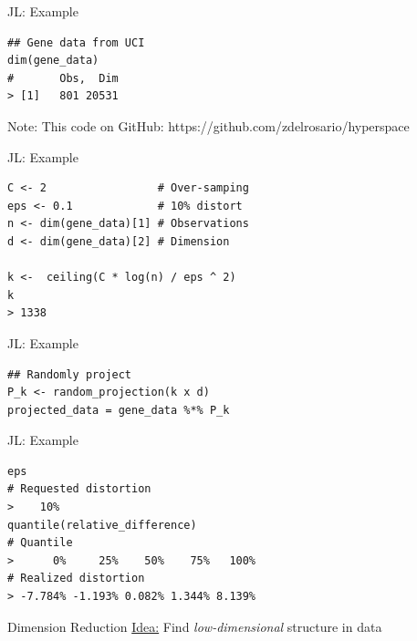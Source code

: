 \documentclass[14pt]{beamer}
\begin{document}
\begin{frame}[fragile]{JL: Example}
  \begin{lstlisting}
## Gene data from UCI
dim(gene_data)
#       Obs,  Dim
> [1]   801 20531
  \end{lstlisting}

  \bigskip
  Note: This code on GitHub: https://github.com/zdelrosario/hyperspace
\end{frame}

\begin{frame}[fragile]{JL: Example}
  \begin{lstlisting}
C <- 2                 # Over-samping
eps <- 0.1             # 10% distort
n <- dim(gene_data)[1] # Observations
d <- dim(gene_data)[2] # Dimension

k <-  ceiling(C * log(n) / eps ^ 2)
k
> 1338
  \end{lstlisting}
\end{frame}

\begin{frame}[fragile]{JL: Example}
  \begin{lstlisting}
## Randomly project
P_k <- random_projection(k x d)
projected_data = gene_data %*% P_k
  \end{lstlisting}
\end{frame}

\begin{frame}[fragile]{JL: Example}
  \begin{lstlisting}
eps
# Requested distortion
>    10%
quantile(relative_difference)
# Quantile
>      0%     25%    50%    75%   100%
# Realized distortion
> -7.784% -1.193% 0.082% 1.344% 8.139%
  \end{lstlisting}
\end{frame}


\begin{frame}{Dimension Reduction}
  \huge\underline{Idea:} Find \emph{low-dimensional} structure in data
\end{frame}
\end{document}
